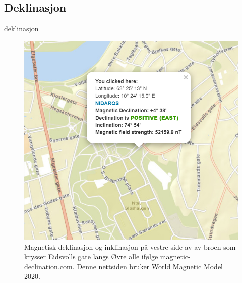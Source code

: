 \subsection{Deklinasjon}

{deklinasjon}

\begin{figure}
    \centering
    \includegraphics{img/WMM.png}
    \caption{Magnetisk deklinasjon og inklinasjon på vestre side av av broen som krysser Eidsvolls gate langs Øvre alle ifølge \href{https://www.magnetic-declination.com/}{magnetic-declination.com}. Denne nettsiden bruker World Magnetic Model 2020.}
    \label{fig:WMM}
\end{figure}
